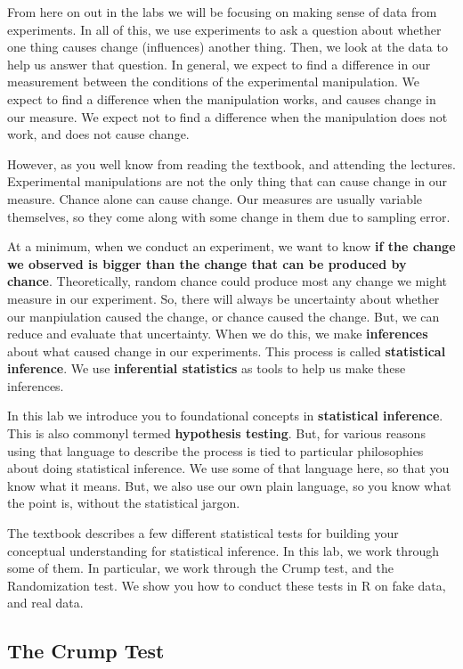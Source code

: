 \documentclass[]{book}
\theoremstyle{definition}
\theoremstyle{definition}
\theoremstyle{definition}
\theoremstyle{remark}
\begin{document}
From here on out in the labs we will be focusing on making sense of data
from experiments. In all of this, we use experiments to ask a question
about whether one thing causes change (influences) another thing. Then,
we look at the data to help us answer that question. In general, we
expect to find a difference in our measurement between the conditions of
the experimental manipulation. We expect to find a difference when the
manipulation works, and causes change in our measure. We expect not to
find a difference when the manipulation does not work, and does not
cause change.

However, as you well know from reading the textbook, and attending the
lectures. Experimental manipulations are not the only thing that can
cause change in our measure. Chance alone can cause change. Our measures
are usually variable themselves, so they come along with some change in
them due to sampling error.

At a minimum, when we conduct an experiment, we want to know \textbf{if
the change we observed is bigger than the change that can be produced by
chance}. Theoretically, random chance could produce most any change we
might measure in our experiment. So, there will always be uncertainty
about whether our manpiulation caused the change, or chance caused the
change. But, we can reduce and evaluate that uncertainty. When we do
this, we make \textbf{inferences} about what caused change in our
experiments. This process is called \textbf{statistical inference}. We
use \textbf{inferential statistics} as tools to help us make these
inferences.

In this lab we introduce you to foundational concepts in
\textbf{statistical inference}. This is also commonyl termed
\textbf{hypothesis testing}. But, for various reasons using that
language to describe the process is tied to particular philosophies
about doing statistical inference. We use some of that language here, so
that you know what it means. But, we also use our own plain language, so
you know what the point is, without the statistical jargon.

The textbook describes a few different statistical tests for building
your conceptual understanding for statistical inference. In this lab, we
work through some of them. In particular, we work through the Crump
test, and the Randomization test. We show you how to conduct these tests
in R on fake data, and real data.

\subsection{The Crump Test}\label{the-crump-test}
\end{document}
